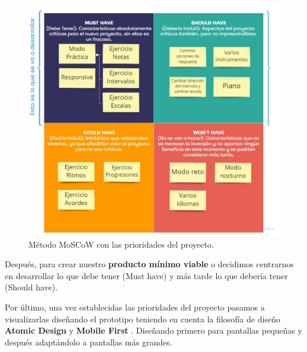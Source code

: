 \documentclass[12pt,twoside,titlepage]{report}
\begin{document}
\begin{figure}[H]
    \centering
    \includegraphics[width=\textwidth]{Design Thinking/MosCow}
    \caption{Método MoSCoW con las prioridades del proyecto.}
    \label{fig:MoSCoW}
\end{figure}

Después, para crear nuestro \textbf{producto mínimo viable} o decidimos centrarnos en desarrollar lo que debe tener (Must have) y más tarde lo que debería tener (Should have).

Por último, una vez establecidas las prioridades del proyecto pasamos a visualizarlas diseñando el prototipo teniendo en cuenta la filosofía de diseño \textbf{Atomic Design} y \textbf{Mobile First} \cite{mobilefirst}. Diseñando primero para pantallas pequeñas y después adaptándolo a pantallas más grandes. 
\end{document}
